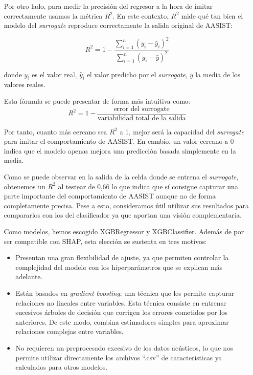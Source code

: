 Por otro lado, para medir la precisión del regresor a la hora de imitar correctamente usamos la métrica  $R^2$. En este contexto, $R^2$ mide qué tan bien el modelo del \textit{surrogate} reproduce correctamente la salida original de AASIST:

\[R^2 = 1 - \frac{\sum_{i=1}^{n} (y_i - \hat{y}_i)^2}{\sum_{i=1}^{n} (y_i - \bar{y})^2}\]

donde $y_i$ es el valor real, $\hat{y}_i$ el valor predicho por el \textit{surrogate}, $\bar{y}$ la media de los valores reales.

Esta fórmula se puede presentar de forma más intuitiva como:
\[
R^2 = 1 - \frac{\text{error del surrogate}}{\text{variabilidad total de la salida}}
\]

Por tanto, cuanto más cercano sea $R^2$ a 1, mejor será la capacidad del \textit{surrogate} para imitar el comportamiento de AASIST. En cambio, un valor cercano a 0 indica que el modelo apenas mejora una predicción basada simplemente en la media.

Como se puede observar en la salida de la celda donde se entrena el \textit{surrogate}, obtenemos un $R^2$ al testear de 0,66 lo que indica que sí consigue capturar una parte importante del comportamiento de AASIST aunque no de forma completamente precisa. Pese a esto, consideramos útil utilizar sus resultados para compararlos con los del clasificador ya que aportan una visión complementaria.

Como modelos, hemos escogido XGBRegressor y XGBClassifier. Además de por ser compatible con SHAP, esta elección se sustenta en tres motivos:
\begin{itemize}
    \item Presentan una gran flexibilidad de ajuste, ya que permiten controlar la complejidad del modelo con los hiperparámetros que se explican más adelante.
    \item Están basados en \textit{gradient boosting}, una técnica que les permite capturar relaciones no lineales entre variables. Esta técnica consiste en entrenar sucesivos árboles de decisión que corrigen los errores cometidos por los anteriores. De este modo, combina estimadores simples para aproximar relaciones complejas entre variables.
    \item No requieren un preprocesado excesivo de los datos acústicos, lo que nos permite utilizar directamente los archivos ``.csv'' de características ya calculados para otros modelos.
\end{itemize}

